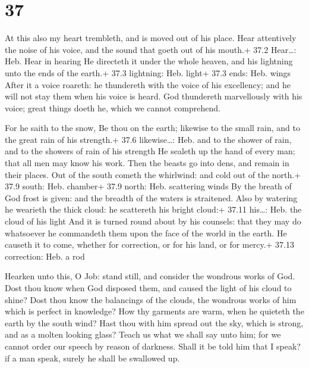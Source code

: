 \hypertarget{section-36}{%
\section{37}\label{section-36}}

 At this also my heart trembleth, and is moved out of his
place.  Hear attentively the noise of his voice, and the
sound that goeth out of his mouth.+ 37.2 Hear\ldots: Heb. Hear in
hearing  He directeth it under the whole heaven, and his
lightning unto the ends of the earth.+ 37.3 lightning: Heb. light+ 37.3
ends: Heb. wings  After it a voice roareth: he thundereth
with the voice of his excellency; and he will not stay them when his
voice is heard.  God thundereth marvellously with his voice;
great things doeth he, which we cannot comprehend.

 For he saith to the snow, Be thou on the earth; likewise to
the small rain, and to the great rain of his strength.+ 37.6
likewise\ldots: Heb. and to the shower of rain, and to the showers of
rain of his strength  He sealeth up the hand of every man;
that all men may know his work.  Then the beasts go into
dens, and remain in their places.  Out of the south cometh
the whirlwind: and cold out of the north.+ 37.9 south: Heb. chamber+
37.9 north: Heb. scattering winds  By the breath of God
frost is given: and the breadth of the waters is straitened.
 Also by watering he wearieth the thick cloud: he
scattereth his bright cloud:+ 37.11 his\ldots: Heb. the cloud of his
light  And it is turned round about by his counsels: that
they may do whatsoever he commandeth them upon the face of the world in
the earth.  He causeth it to come, whether for correction,
or for his land, or for mercy.+ 37.13 correction: Heb. a rod

 Hearken unto this, O Job: stand still, and consider the
wondrous works of God.  Dost thou know when God disposed
them, and caused the light of his cloud to shine?  Dost
thou know the balancings of the clouds, the wondrous works of him which
is perfect in knowledge?  How thy garments are warm, when
he quieteth the earth by the south wind?  Hast thou with
him spread out the sky, which is strong, and as a molten looking glass?
 Teach us what we shall say unto him; for we cannot order
our speech by reason of darkness.  Shall it be told him
that I speak? if a man speak, surely he shall be swallowed up.

